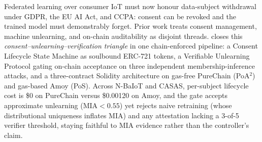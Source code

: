 Federated learning over consumer IoT must now honour data-subject
withdrawal under GDPR, the EU AI Act, and CCPA: consent can be revoked
and the trained model must demonstrably forget. Prior work treats
consent management, machine unlearning, and on-chain auditability as
disjoint threads. \sysname closes this
\emph{consent--unlearning--verification triangle} in one chain-enforced
pipeline: a Consent Lifecycle State Machine as soulbound ERC-721 tokens,
a Verifiable Unlearning Protocol gating on-chain acceptance on three
independent membership-inference attacks, and a three-contract Solidity
architecture on gas-free PureChain (PoA$^2$) and gas-based Amoy (PoS).
Across N-BaIoT and CASAS, per-subject lifecycle cost is \$0 on PureChain
versus \$0.00120 on Amoy, and the gate accepts approximate unlearning
($\text{MIA}\!<\!0.55$) yet rejects naive retraining (whose
distributional uniqueness inflates MIA) and any attestation lacking a
3-of-5 verifier threshold, staying faithful to MIA evidence rather than
the controller's claim.
